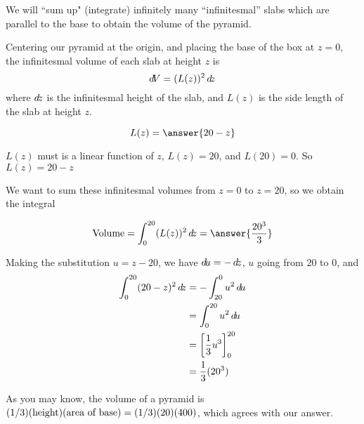 \documentclass{ximera}
\begin{document}
\begin{example}


\begin{explanation}
We will  ``sum up" (integrate) infinitely many ``infinitesmal'' slabs which are parallel to the base to obtain
the volume of the pyramid.

Centering our pyramid at the origin, and placing the base of the box at $z = 0$,
the infinitesmal volume of each slab at height $z$ is 
\[
\mathop{}\!d\! V = (L(z))^2 \mathop{}\!d\! z
\]
where $\mathop{}\!d\! z$ is the infinitesmal height of the slab, and $L(z)$ is the side length of the slab at height $z$. 

\begin{question}
\[
L(z) = \answer{20-z}
\]

\begin{hint}
	$L(z)$ must is a linear function of $z$, $L(z) = 20$, and $L(20) = 0$.  So $L(z) = 20-z$
\end{hint}
\end{question}

We want to sum these infinitesmal volumes from $z=0$ to $z = 20$, so we obtain the integral

\begin{question}
\[
\textrm{Volume} = \int_0^{20} (L(z))^2 \d z = \answer{\frac{20^3}{3}}
\]

\begin{hint}
	Making the substitution $u = z-20$, we have $\mathop{}\!d\! u = - \mathop{}\!d\! z$, $u$ going from $20$ to $0$, and 
	\begin{align*}
	\int_0^{20} (20-z)^2 \mathop{}\!d\! z &= -\int_{20}^{0} u^2 \mathop{}\!d\! u\\
		&= \int_0^{20} u^2 \mathop{}\!d\! u\\
		&= \bigg[ \frac{1}{3} u^3 \bigg]_0^{20}\\
		&= \frac{1}{3}(20^3)
	\end{align*}
\end{hint}
\end{question}

As you may know, the volume of a pyramid is 
$(1/3)(\hbox{height})(\hbox{area of base})=(1/3)(20)(400)$, which
agrees with our answer.
\end{explanation}
\end{example}
\end{document}
